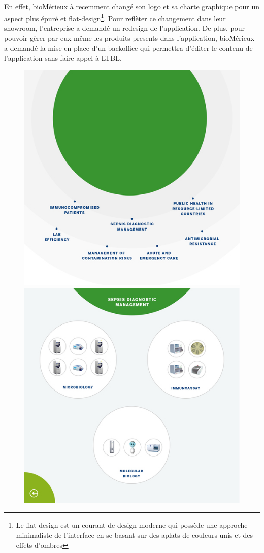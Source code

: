 En effet, bioMérieux à recemment changé son logo et sa charte graphique pour un aspect plus épuré et flat-design\footnote{Le flat-design est un courant de design moderne qui possède une approche minimaliste de l'interface en se basant sur des aplats de couleurs unis et des effets d'ombres}.
Pour reflèter ce changement dans leur showroom, l'entreprise a demandé un redesign de l'application.
De plus, pour pouvoir gèrer par eux même les produits presents dans l'application, bioMérieux a demandé la mise en place d'un backoffice qui permettra d'éditer le contenu de l'application sans faire appel à LTBL.

\begin{figure}[h]
    \centering
    \includegraphics[scale=0.195]{img/resized-bmx-1-new.jpg}
    \includegraphics[scale=0.195]{img/resized-bmx-2-new.jpg}

\end{figure}
